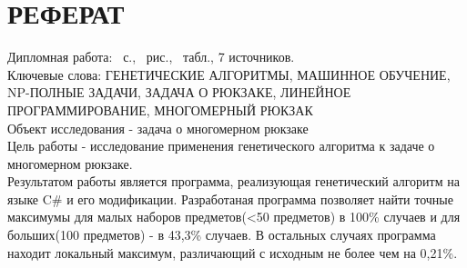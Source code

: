 \pagestyle{plain}
\chapter*{РЕФЕРАТ}
\thispagestyle{empty}   %
Дипломная работа: \pageref*{LastPage}~с., \totfig~рис., \tottab~табл., 7 источников.\\
Ключевые слова: ГЕНЕТИЧЕСКИЕ АЛГОРИТМЫ, МАШИННОЕ ОБУЧЕНИЕ, NP-ПОЛНЫЕ ЗАДАЧИ, ЗАДАЧА О РЮКЗАКЕ, ЛИНЕЙНОЕ ПРОГРАММИРОВАНИЕ, МНОГОМЕРНЫЙ РЮКЗАК\\
Объект исследования - задача о многомерном рюкзаке\\
Цель работы - исследование применения генетического алгоритма к задаче о многомерном рюкзаке.\\
Результатом работы является программа, реализующая генетический алгоритм на языке C\# и его модификации.
Разработаная программа позволяет найти точные максимумы для малых наборов предметов(<50 предметов) в 100\% случаев и для больших(100 предметов) - в 43,3\% случаев. В остальных случаях программа находит локальный максимум, различающий с исходным не более чем на 0,21\%.

\cleardoublepage               %
